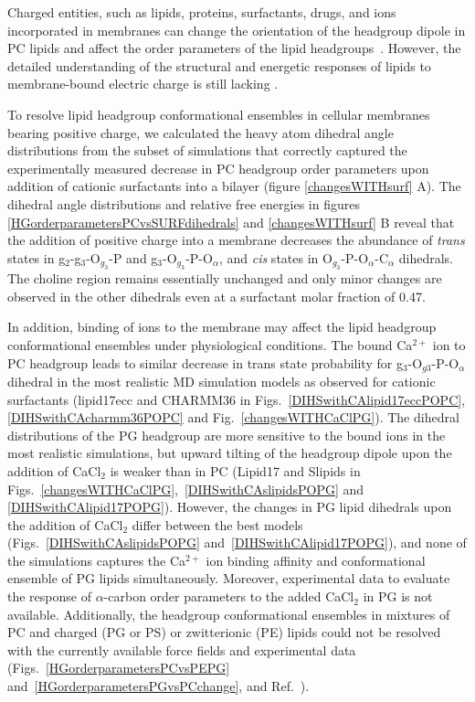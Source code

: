 \documentclass[journal=jpcbfk,manuscript=article]{achemso}
\begin{document}
Charged entities, such as lipids, proteins, surfactants, drugs, and ions incorporated in membranes can change the orientation of the headgroup dipole in PC lipids and affect the order parameters of the lipid headgroups~\cite{seelig87}. However, the detailed understanding of the structural and energetic responses of lipids to membrane-bound electric charge is still lacking \cite{Semchyschyn04}.

To resolve lipid headgroup conformational ensembles in cellular membranes bearing positive charge,
we calculated the heavy atom dihedral angle distributions from 
the subset of simulations 
that correctly captured the experimentally measured decrease in PC headgroup order parameters upon addition of cationic surfactants into a bilayer (figure \ref{changesWITHsurf} A).
The dihedral angle distributions and relative free energies
in figures \ref{HGorderparametersPCvsSURFdihedrals} and \ref{changesWITHsurf} B reveal that the
addition of positive charge into a membrane 
decreases the abundance of \textit{trans} states in g$_2$-g$_3$-O$_{g_3}$-P and g$_3$-O$_{g_3}$-P-O$_\alpha$, and \textit{cis} states in O$_{g_3}$-P-O$_\alpha$-C$_\alpha$ dihedrals.
The choline region remains essentially unchanged and only minor changes are observed in the other dihedrals even at a surfactant molar fraction of 0.47.

In addition, binding of ions to the membrane may affect the lipid headgroup conformational ensembles under physiological conditions.
The bound Ca$^{2+}$ ion to PC headgroup leads to similar decrease in trans state probability for g$_3$-O$_{g3}$-P-O$_\alpha$ dihedral
in the most realistic MD simulation models
as observed for cationic surfactants
(lipid17ecc and CHARMM36 in Figs.~\ref{DIHSwithCAlipid17eccPOPC}, \ref{DIHSwithCAcharmm36POPC} and Fig.~\ref{changesWITHCaClPG}).
The dihedral distributions of the PG headgroup are more sensitive to the bound ions in the most realistic simulations,
but upward tilting of the headgroup dipole upon the addition of CaCl$_2$ is weaker than in PC
(Lipid17 and Slipids in Figs.~\ref{changesWITHCaClPG},~\ref{DIHSwithCAslipidsPOPG} and \ref{DIHSwithCAlipid17POPG}).
However, the changes in PG lipid dihedrals upon the addition of CaCl$_2$ differ between the best models (Figs.~\ref{DIHSwithCAslipidsPOPG} and~\ref{DIHSwithCAlipid17POPG}), and none of the simulations captures the Ca$^{2+}$ ion binding affinity and conformational ensemble of PG lipids simultaneously. Moreover, experimental data to evaluate the response of $\alpha$-carbon order parameters to the added CaCl$_2$ in PG is not available.
Additionally, the headgroup conformational ensembles in mixtures of PC and charged (PG or PS) or zwitterionic (PE)
lipids could not be resolved with the currently available force fields and experimental data
(Figs.~\ref{HGorderparametersPCvsPEPG} and~\ref{HGorderparametersPGvsPCchange}, and Ref.~\cite{melcrova16,antila19,melcr20}).
\end{document}
